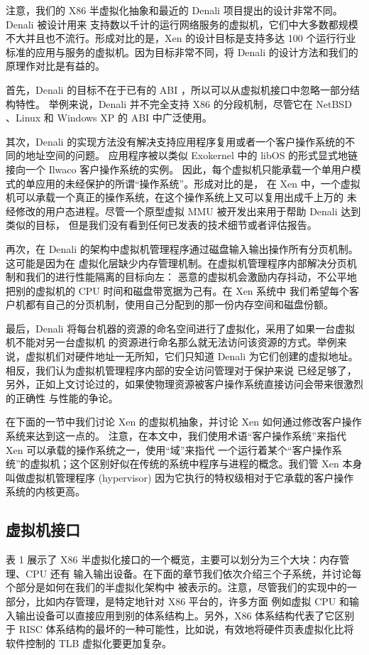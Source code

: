 注意，我们的 X86 半虚拟化抽象和最近的 Denali 项目提出的设计非常不同。Denali 被设计用来
支持数以千计的运行网络服务的虚拟机，它们中大多数都规模不大并且也不流行。形成对比的是，Xen
的设计目标是支持多达 100 个运行行业标准的应用与服务的虚拟机。因为目标非常不同，将 Denali
的设计方法和我们的原理作对比是有益的。

首先，Denali 的目标不在于已有的 ABI ，所以可以从虚拟机接口中忽略一部分结构特性。
举例来说，Denali 并不完全支持 X86 的分段机制，尽管它在 NetBSD 、Linux 和 Windows XP
的 ABI 中广泛使用。

其次，Denali 的实现方法没有解决支持应用程序复用或者一个客户操作系统的不同的地址空间的问题。
应用程序被以类似 Exokernel 中的 libOS 的形式显式地链接向一个 Ilwaco 客户操作系统的实例。
因此，每个虚拟机只能承载一个单用户模式的单应用的未经保护的所谓“操作系统”。形成对比的是，
在 Xen 中，一个虚拟机可以承载一个真正的操作系统，在这个操作系统上又可以复用出成千上万的
未经修改的用户态进程。尽管一个原型虚拟 MMU 被开发出来用于帮助 Denali 达到类似的目标，
但是我们没有看到任何已发表的技术细节或者评估报告。

再次，在 Denali 的架构中虚拟机管理程序通过磁盘输入输出操作所有分页机制。这可能是因为在
虚拟化层缺少内存管理机制。在虚拟机管理程序内部解决分页机制和我们的进行性能隔离的目标向左：
恶意的虚拟机会激励内存抖动，不公平地把别的虚拟机的 CPU 时间和磁盘带宽据为己有。在 Xen 系统中
我们希望每个客户机都有自己的分页机制，使用自己分配到的那一份内存空间和磁盘份额。

最后，Denali 将每台机器的资源的命名空间进行了虚拟化，采用了如果一台虚拟机不能对另一台虚拟机
的资源进行命名那么就无法访问该资源的方式。举例来说，虚拟机们对硬件地址一无所知，它们只知道
Denali 为它们创建的虚拟地址。相反，我们认为虚拟机管理程序内部的安全访问管理对于保护来说
已经足够了，另外，正如上文讨论过的，如果使物理资源被客户操作系统直接访问会带来很激烈的正确性
与性能的争论。

在下面的一节中我们讨论 Xen 的虚拟机抽象，并讨论 Xen 如何通过修改客户操作系统来达到这一点的。
注意，在本文中，我们使用术语“客户操作系统”来指代 Xen 可以承载的操作系统之一，使用“域”来指代
一个运行着某个“客户操作系统”的虚拟机；这个区别好似在传统的系统中程序与进程的概念。我们管 Xen
本身叫做虚拟机管理程序 (hypervisor) 因为它执行的特权级相对于它承载的客户操作系统的内核更高。

\subsection{虚拟机接口}

表 1 展示了 X86 半虚拟化接口的一个概览，主要可以划分为三个大块：内存管理、CPU 还有
输入输出设备。在下面的章节我们依次介绍三个子系统，并讨论每个部分是如何在我们的半虚拟化架构中
被表示的。注意，尽管我们的实现中的一部分，比如内存管理，是特定地针对 X86 平台的，许多方面
例如虚拟 CPU 和输入输出设备可以直接应用到别的体系结构上。另外，X86 体系结构代表了它区别于
RISC 体系结构的最坏的一种可能性，比如说，有效地将硬件页表虚拟化比将软件控制的 TLB
虚拟化要更加复杂。

